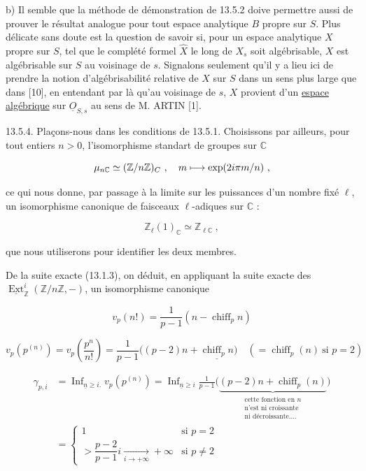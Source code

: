 b) Il semble que la méthode de démonstration de 13.5.2 doive permettre aussi de prouver le résultat analogue pour tout espace analytique $B$ propre sur $S$. Plus délicate sans doute est la question de savoir si, pour un espace analytique $X$ propre sur $S$, tel que le complété formel $\widehat X$ le long de $X_s$ soit algébrisable, $X$ est algébrisable sur $S$ au voisinage de $s$. Signalons seulement qu'il y a lieu ici de prendre la notion d'algébrisabilité relative de $X$ sur $S$ dans un sens plus large que dans [10], en entendant par là qu'au voisinage de $s$, $X$ provient d'un \uline{espace algébrique} sur $\underline O_{S,s}$ au sens de M. ARTIN [1].

13.5.4. Plaçons-nous dans les conditions de 13.5.1. Choisissons par ailleurs, pour tout entiers $n>0$, l'isomorphisme standart de groupes sur $\mathbb C$

\[
 \handwritten{\mu}_{n\mathbb C}\simeq(\mathbb Z/n\mathbb Z)_C\ ,\quad m\longmapsto\exp(2i\pi m/n)\ ,
\]

ce qui nous donne, par passage à la limite sur les puissances d'un nombre fixé $\ell$, un isomorphisme canonique de faisceaux $\ell$-adiques sur $\mathbb C$ :

\[
 \mathbb Z_\ell(1)_{\mathbb C}\simeq\mathbb Z_{\ell\mathbb C}\ ,
\]

que nous utiliserons pour identifier les deux membres.

De la suite exacte (13.1.3), on déduit, en appliquant la suite exacte des $\underline{\operatorname{Ext}}_{\mathbb Z}^i(\mathbb Z/n\mathbb Z,-)$, un isomorphisme canonique




\[
 v_p(n!)=\frac{1}{p-1}(n-\operatorname{chiff}_p n)
\]

\[
 v_p(p^{(n)})=v_p\left(\frac{p^n}{n!}\right)=\frac{1}{p-1}\bigl((p-2)n+\underline{\operatorname{chiff}_p n}\bigr)
 \quad(=\operatorname{chiff}_p(n)\ \text{si }p=2)
\]


\[
\begin{aligned}
 \gamma_{p,i}&=\mathop{\mathrm{Inf}}_{\underline n\geq i.}v_p(p^{(n)})
 =\mathop{\mathrm{Inf}}_{\underline n\geq i}\frac1{p-1}\bigl(\underbrace{(p-2)n+\operatorname{chiff}_p(n)}_{\substack{\text{cette fonction en }n\\\text{n'est ni croissante}\\\text{ni décroissante\ldots.}}}\bigr)\\
 &=\begin{cases}1&\text{si }p=2\\
 >\dfrac{p-2}{p-1}i\xrightarrow[i\to+\infty]{}+\infty&\text{si }p\ne2\end{cases}
\end{aligned}
\]


